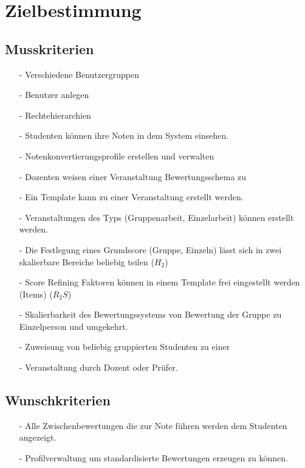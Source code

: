 


	
	\tableofcontents
	\newpage

	\section{Zielbestimmung}
		\subsection{Musskriterien}			

			
			\begin{itemize}
			\item[-]	Verschiedene Benutzergruppen
			\item[-]	Benutzer anlegen 
			\item[-]	Rechtehierarchien
			\item[-]	Studenten können ihre Noten in dem System einsehen.
			\item[-]	Notenkonvertierungsprofile erstellen und verwalten
			\item[-]	Dozenten weisen einer Veranstaltung Bewertungsschema zu
			\item[-]	Ein Template kann zu einer Veranstaltung erstellt werden.
			\item[-]	Veranstaltungen des Typs (Gruppenarbeit, Einzelarbeit) können erstellt werden.
			\item[-]	Die Festlegung eines Grundscore (Gruppe, Einzeln) lässt sich in zwei skalierbare \newline Bereiche beliebig teilen ($H_2$)
			\item[-]	Score Refining Faktoren können in einem Template frei eingestellt werden (Items) ($R_2S$)
			\item[-]	Skalierbarkeit des Bewertungssystems von Bewertung der Gruppe zu Einzelperson und umgekehrt.
			\item[-]	Zuweisung von beliebig gruppierten Studenten zu einer \item[-]	Veranstaltung durch Dozent oder Prüfer.				
			\end{itemize}

			
		\subsection{Wunschkriterien}
		\begin{itemize}
		\item[-]	Alle Zwischenbewertungen die zur Note führen werden dem Studenten angezeigt.
		\item[-]	Profilverwaltung um standardisierte Bewertungen erzeugen zu können.
		\end{itemize}
		

